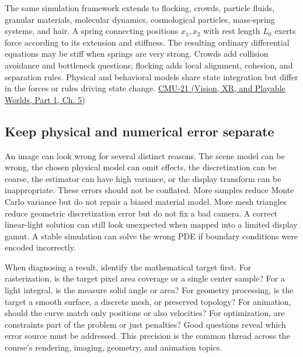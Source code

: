 The same simulation framework extends to flocking, crowds, particle fluids, granular materials, molecular dynamics, cosmological particles, mass-spring systems, and hair. A spring connecting positions \(x_1,x_2\) with rest length \(L_0\) exerts force according to its extension and stiffness. The resulting ordinary differential equations may be stiff when springs are very strong. Crowds add collision avoidance and bottleneck questions; flocking adds local alignment, cohesion, and separation rules. Physical and behavioral models share state integration but differ in the forces or rules driving state change. \href{../07-Vision-XR-and-Playable-Worlds-P01/main.pdf\#nameddest=04-visual-computing-ii-ch036-cmu-21---dynamics-and-time-integration}{CMU-21 (Vision, XR, and Playable Worlds, Part 1, Ch. 5)}

\subsection{Keep physical and numerical error separate}\label{04-visual-computing-ii-ch029-keep-physical-and-numerical-error-separate}

\hypertarget{04-visual-computing-ii-ch029-keep-physical-and-numerical-error-separate}{}

An image can look wrong for several distinct reasons. The scene model can be wrong, the chosen physical model can omit effects, the discretization can be coarse, the estimator can have high variance, or the display transform can be inappropriate. These errors should not be conflated. More samples reduce Monte Carlo variance but do not repair a biased material model. More mesh triangles reduce geometric discretization error but do not fix a bad camera. A correct linear-light solution can still look unexpected when mapped into a limited display gamut. A stable simulation can solve the wrong PDE if boundary conditions were encoded incorrectly.

When diagnosing a result, identify the mathematical target first. For rasterization, is the target pixel area coverage or a single center sample? For a light integral, is the measure solid angle or area? For geometry processing, is the target a smooth surface, a discrete mesh, or preserved topology? For animation, should the curve match only positions or also velocities? For optimization, are constraints part of the problem or just penalties? Good questions reveal which error source must be addressed. This precision is the common thread across the course's rendering, imaging, geometry, and animation topics.

